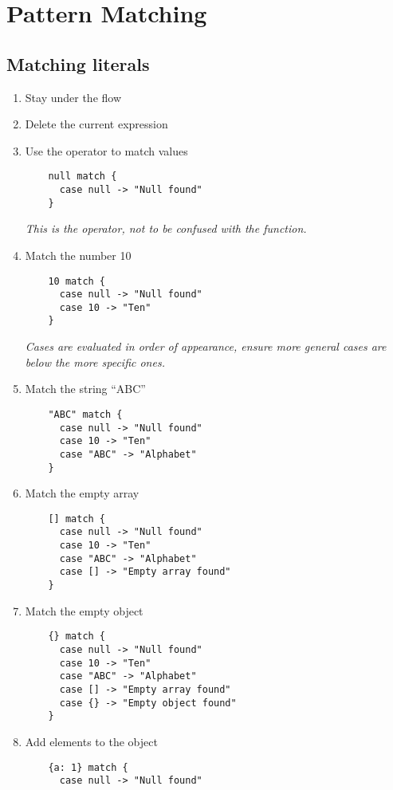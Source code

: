\section{Pattern Matching}

\subsection{Matching literals}
\begin{enumerate}
\item Stay under the  flow
\item Delete the current expression
\item Use the  operator to match  values
  \begin{lstlisting}
    null match {
      case null -> "Null found"
    }
  \end{lstlisting}
  \emph{
    This is the  operator, not to be confused with the  function.
  }
\item Match the number 10
  \begin{lstlisting}
    10 match {
      case null -> "Null found"
      case 10 -> "Ten"
    }
  \end{lstlisting}
  \emph{
    Cases are evaluated in order of appearance, ensure more general cases are below the more specific ones.
  }
\item Match the string ``ABC''
  \begin{lstlisting}
    "ABC" match {
      case null -> "Null found"
      case 10 -> "Ten"
      case "ABC" -> "Alphabet"
    }
  \end{lstlisting}
\item Match the empty array
  \begin{lstlisting}
    [] match {
      case null -> "Null found"
      case 10 -> "Ten"
      case "ABC" -> "Alphabet"
      case [] -> "Empty array found"
    }
  \end{lstlisting}
\item Match the empty object
  \begin{lstlisting}
    {} match {
      case null -> "Null found"
      case 10 -> "Ten"
      case "ABC" -> "Alphabet"
      case [] -> "Empty array found"
      case {} -> "Empty object found"
    }
  \end{lstlisting}
\item Add elements to the object
  \begin{lstlisting}
    {a: 1} match {
      case null -> "Null found"

\end{lstlisting}
\end{enumerate}
